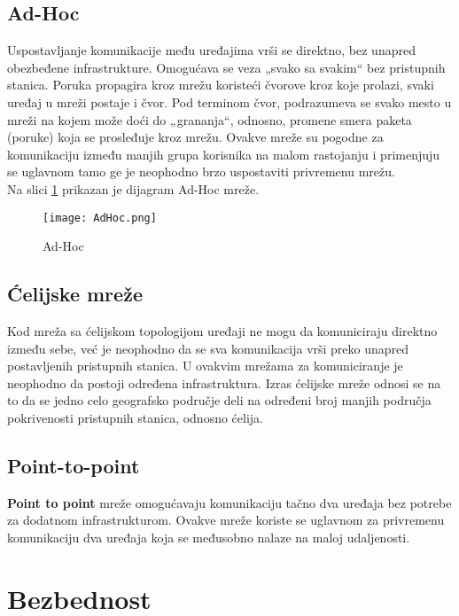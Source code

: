\documentclass[a4paper]{article}
\begin{document}
{    \subsection{Ad-Hoc}
Uspostavljanje komunikacije među uređajima vrši se direktno, bez unapred obezbeđene infrastrukture. Omogućava se veza „svako sa svakim“ bez pristupnih stanica. Poruka propagira kroz mrežu koristeći čvorove kroz koje prolazi, svaki uređaj u mreži postaje i čvor. Pod terminom čvor, podrazumeva se svako mesto u mreži na kojem može doći do „grananja“, odnosno, promene smera paketa (poruke) koja se prosleđuje kroz mrežu. Ovakve mreže su pogodne za komunikaciju između manjih grupa korisnika na malom rastojanju i primenjuju se uglavnom tamo ge je neophodno brzo uspostaviti privremenu mrežu.\\
Na slici \ref{fig:adhoc} prikazan je dijagram Ad-Hoc mreže.
\newpage

\begin{figure}[h!]
\begin{center}
\texttt{[image: AdHoc.png]}
\end{center}
\caption{Ad-Hoc \cite{AdHoc}}
\label{fig:adhoc}
\end{figure}



    \subsection{Ćelijske mreže}
 Kod mreža sa ćelijskom topologijom uređaji ne mogu da komuniciraju direktno između sebe, već je neophodno da se sva komunikacija vrši preko unapred postavljenih pristupnih stanica. U ovakvim mrežama za komuniciranje je neophodno da postoji određena infrastruktura. Izras ćelijske mreže odnosi se na to da se jedno celo geografsko područje deli na određeni broj manjih područja pokrivenosti pristupnih stanica, odnosno ćelija.

    \subsection{Point-to-point}
\textbf{Point to point} mreže omogućavaju komunikaciju tačno dva uređaja bez potrebe za dodatnom infrastrukturom. Ovakve mreže koriste se uglavnom za privremenu komunikaciju dva uređaja koja se međusobno nalaze na maloj udaljenosti.

\section{Bezbednost}	
\label{sec:Bezbednost}

}
\end{document}

